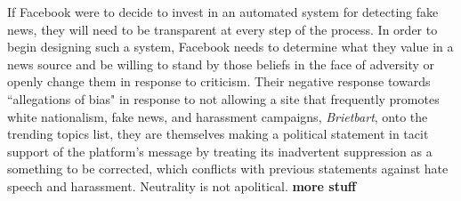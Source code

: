 \documentclass[12pt]{article}
\begin{document}
If Facebook were to decide to invest in an automated system for detecting fake news, they will need to be transparent at every step of the process. In order to begin designing such a system, Facebook needs to determine what they value in a news source and be willing to stand by those beliefs in the face of adversity or openly change them in response to criticism. Their negative response towards ``allegations of bias" in response to not allowing a site that frequently promotes white nationalism, fake news, and harassment campaigns, \textit{Brietbart}, onto the trending topics list, they are themselves making a political statement in tacit support of the platform's message by treating its inadvertent suppression as a something to be corrected, which conflicts with previous statements against hate speech and harassment. Neutrality is not apolitical. \textbf{more stuff}

\newpage
%
%
\printbibliography
\end{document}
